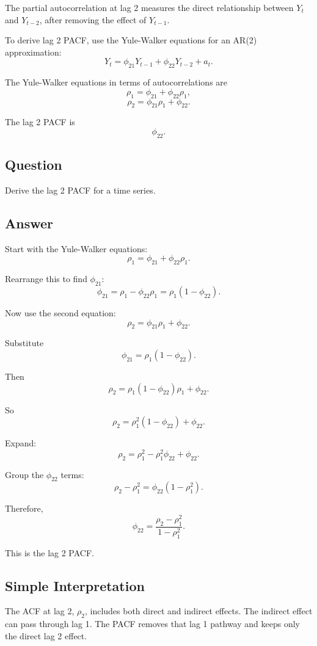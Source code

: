 \documentclass[12pt]{article}
\begin{document}
The partial autocorrelation at lag 2 measures the direct relationship between
\(Y_t\) and \(Y_{t-2}\), after removing the effect of \(Y_{t-1}\).

To derive lag 2 PACF, use the Yule-Walker equations for an AR(2) approximation:
\[
Y_t = \phi_{21}Y_{t-1}+\phi_{22}Y_{t-2}+a_t.
\]

The Yule-Walker equations in terms of autocorrelations are
\[
\rho_1 = \phi_{21} + \phi_{22}\rho_1,
\]
\[
\rho_2 = \phi_{21}\rho_1 + \phi_{22}.
\]

The lag 2 PACF is
\[
\phi_{22}.
\]

\subsection*{Question}

Derive the lag 2 PACF for a time series.

\subsection*{Answer}

Start with the Yule-Walker equations:
\[
\rho_1 = \phi_{21} + \phi_{22}\rho_1.
\]

Rearrange this to find \(\phi_{21}\):
\[
\phi_{21}
=
\rho_1-\phi_{22}\rho_1
=
\rho_1(1-\phi_{22}).
\]

Now use the second equation:
\[
\rho_2 = \phi_{21}\rho_1 + \phi_{22}.
\]

Substitute
\[
\phi_{21}=\rho_1(1-\phi_{22}).
\]

Then
\[
\rho_2
=
\rho_1(1-\phi_{22})\rho_1+\phi_{22}.
\]

So
\[
\rho_2
=
\rho_1^2(1-\phi_{22})+\phi_{22}.
\]

Expand:
\[
\rho_2
=
\rho_1^2-\rho_1^2\phi_{22}+\phi_{22}.
\]

Group the \(\phi_{22}\) terms:
\[
\rho_2-\rho_1^2
=
\phi_{22}(1-\rho_1^2).
\]

Therefore,
\[
\boxed{
\phi_{22}
=
\frac{\rho_2-\rho_1^2}{1-\rho_1^2}
}.
\]

This is the lag 2 PACF.

\subsection*{Simple Interpretation}

The ACF at lag 2, \(\rho_2\), includes both direct and indirect effects.  The
indirect effect can pass through lag 1.  The PACF removes that lag 1 pathway and
keeps only the direct lag 2 effect.
\end{document}
